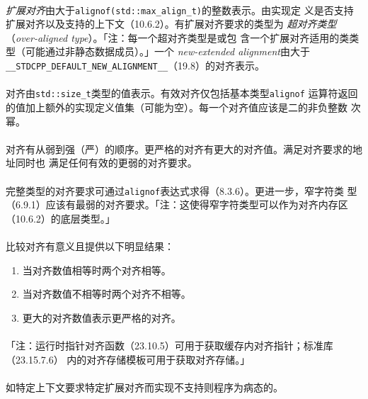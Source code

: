 \paragraph{}
\textit{扩展对齐}由大于\texttt{alignof(std::max\_align\_t)}的整数表示。由实现定
义是否支持扩展对齐以及支持的上下文（10.6.2）。有扩展对齐要求的类型为
\textit{超对齐类型}（\textit{over-aligned type}）。「注：每一个超对齐类型是或包
含一个扩展对齐适用的类类型（可能通过非静态数据成员）。」一个
\textit{new-extended alignment}由大于
\texttt{\_\_STDCPP\_DEFAULT\_NEW\_ALIGNMENT\_\_}（19.8）的对齐表示。

\paragraph{}
对齐由\texttt{std::size\_t}类型的值表示。有效对齐仅包括基本类型\texttt{alignof}
运算符返回的值加上额外的实现定义值集（可能为空）。每一个对齐值应该是二的非负整数
次幂。

\paragraph{}
对齐有从弱到强（严）的顺序。更严格的对齐有更大的对齐值。满足对齐要求的地址同时也
满足任何有效的更弱的对齐要求。

\paragraph{}
完整类型的对齐要求可通过\texttt{alignof}表达式求得（8.3.6）。更进一步，窄字符类
型（6.9.1）应该有最弱的对齐要求。「注：这使得窄字符类型可以作为对齐内存区
（10.6.2）的底层类型。」

\paragraph{}
比较对齐有意义且提供以下明显结果：
\begin{enumerate}
  \item{当对齐数值相等时两个对齐相等。}
  \item{当对齐数值不相等时两个对齐不相等。}
  \item{更大的对齐数值表示更严格的对齐。}
\end{enumerate}

\paragraph{}
「注：运行时指针对齐函数（23.10.5）可用于获取缓存内对齐指针；标准库（23.15.7.6）
内的对齐存储模板可用于获取对齐存储。」

\paragraph{}
如特定上下文要求特定扩展对齐而实现不支持则程序为病态的。
